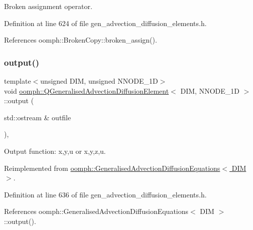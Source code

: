 Broken assignment operator. 



Definition at line 624 of file gen\+\_\+advection\+\_\+diffusion\+\_\+elements.\+h.



References oomph\+::\+Broken\+Copy\+::broken\+\_\+assign().

\mbox{\label{classoomph_1_1QGeneralisedAdvectionDiffusionElement_adcbd395387f1665caeede9ee8020a8cc}} 
\subsubsection{\texorpdfstring{output()}{output()}\hspace{0.1cm}{\footnotesize\ttfamily [1/4]}}
{\footnotesize\ttfamily template$<$unsigned D\+IM, unsigned N\+N\+O\+D\+E\+\_\+1D$>$ \\
void \hyperlink{classoomph_1_1QGeneralisedAdvectionDiffusionElement}{oomph\+::\+Q\+Generalised\+Advection\+Diffusion\+Element}$<$ D\+IM, N\+N\+O\+D\+E\+\_\+1D $>$\+::output (\begin{DoxyParamCaption}\item[{std\+::ostream \&}]{outfile }\end{DoxyParamCaption})\hspace{0.3cm}{\ttfamily [inline]}, {\ttfamily [virtual]}}



Output function\+: x,y,u or x,y,z,u. 



Reimplemented from \hyperlink{classoomph_1_1GeneralisedAdvectionDiffusionEquations_a6a225f0d19451429969ba92705bce96e}{oomph\+::\+Generalised\+Advection\+Diffusion\+Equations$<$ D\+I\+M $>$}.



Definition at line 636 of file gen\+\_\+advection\+\_\+diffusion\+\_\+elements.\+h.



References oomph\+::\+Generalised\+Advection\+Diffusion\+Equations$<$ D\+I\+M $>$\+::output().

\mbox{\label{classoomph_1_1QGeneralisedAdvectionDiffusionElement_ae9327403058a327074ab0de659dc4609}} 
